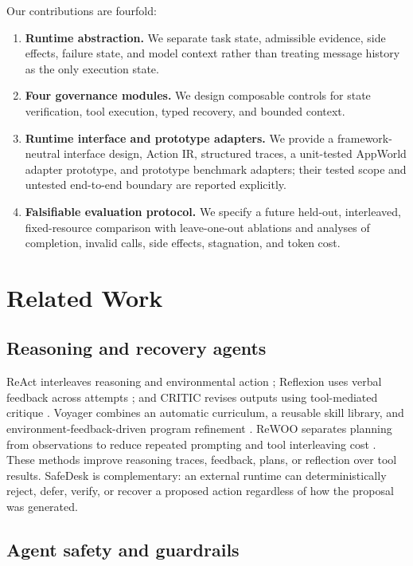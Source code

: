 \documentclass[10pt]{article}
\newcommand{\safedesk}{SafeDesk}
\begin{document}
Our contributions are fourfold:
\begin{enumerate}
  \item \textbf{Runtime abstraction.} We separate task state, admissible evidence,
        side effects, failure state, and model context rather than treating message
        history as the only execution state.
  \item \textbf{Four governance modules.} We design composable controls for state
        verification, tool execution, typed recovery, and bounded context.
  \item \textbf{Runtime interface and prototype adapters.} We provide a
        framework-neutral interface design, Action IR, structured traces, a
        unit-tested AppWorld adapter prototype, and prototype benchmark adapters; their
        tested scope and untested end-to-end boundary are reported explicitly.
  \item \textbf{Falsifiable evaluation protocol.} We specify a future held-out,
        interleaved, fixed-resource comparison with leave-one-out ablations and
        analyses of completion, invalid calls, side effects, stagnation, and token cost.
\end{enumerate}

\section{Related Work}

\subsection{Reasoning and recovery agents}

ReAct interleaves reasoning and environmental action
\citep{yao2023react}; Reflexion uses verbal feedback across attempts
\citep{shinn2023reflexion}; and CRITIC revises outputs using tool-mediated critique
\citep{gou2023critic}. Voyager combines an automatic curriculum, a reusable skill
library, and environment-feedback-driven program refinement
\citep{wang2023voyager}. ReWOO separates planning from observations to reduce
repeated prompting and tool interleaving cost \citep{xu2023rewoo}. These methods
improve reasoning traces, feedback, plans, or reflection over tool results.
\safedesk{} is complementary: an external runtime can deterministically reject,
defer, verify, or recover a proposed action regardless of how the proposal was generated.

\subsection{Agent safety and guardrails}
\end{document}
